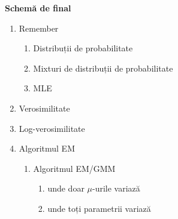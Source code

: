 \documentclass[12pt]{article}
\begin{document}
	\newpage
	\textbf{\large{Schemă de final}}
	\begin{enumerate}
		\item Remember
		\begin{enumerate}
			\item Distribuții de probabilitate
			\item Mixturi de distribuții de probabilitate
			\item MLE
		\end{enumerate}
		\item Verosimilitate
		\item Log-verosimilitate
		\item Algoritmul EM
		\begin{enumerate}
			\item Algoritmul EM/GMM 
			\begin{enumerate}
				\item unde doar $\mu$-urile variază
				\item unde toți parametrii variază
			\end{enumerate}
		\end{enumerate}
	\end{enumerate}
	

	
\end{document}

